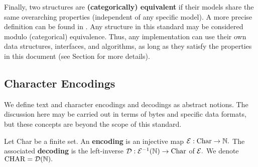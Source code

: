 
Finally, two structures are \textbf{(categorically) equivalent} if their models share the same overarching properties (independent of any specific model). A more precise definition can be found in \cite{theory-equivalence}. Any structure in this standard may be considered modulo (categorical) equivalence. Thus, any implementation can use their own data structures, interfaces, and algorithms, as long as they satisfy the properties in this document (see Section \label{sec:conformance} for more details).

\subsection{Character Encodings}
We define text and character encodings and decodings as abstract notions. The discussion here may be carried out in terms of bytes and specific data formats, but these concepts are beyond the scope of this standard.

\begin{definition}[Encodings]
  Let Char be a finite set. An \textbf{encoding} is an injective map $\mathcal{E} : \mathrm{Char} \to \mathbb{N}.$ The associated \textbf{decoding} is the left-inverse ${\mathcal{D}: \mathcal{E}^{-1}(\mathbb{N}) \to \mathrm{Char}}$ of $\mathcal{E}.$ We denote $\mathrm{CHAR} = \mathcal{D}(\mathbb{N}).$
\end{definition}

